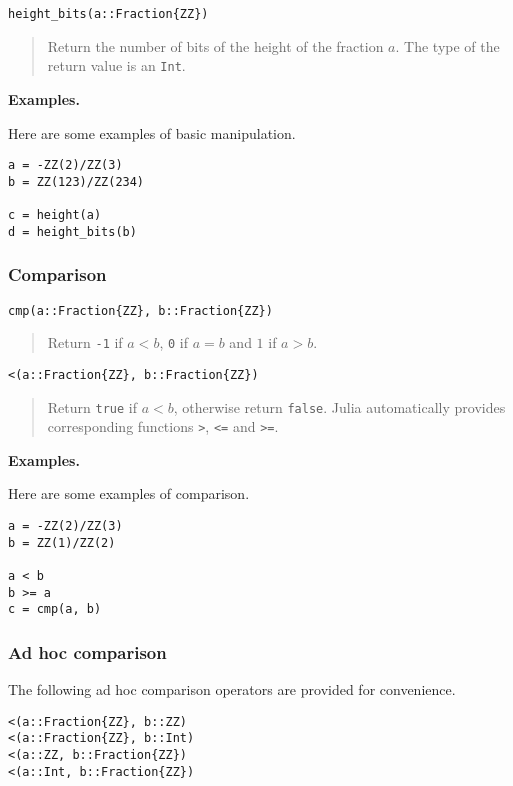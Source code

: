 \documentclass[a4paper,10pt]{article}
\newcommand{\code}{\lstinline}
\newcommand{\desc}[1]{\vspace{-3mm}\begin{quote}#1\end{quote}}
\begin{document}
{{{\begin{lstlisting}
height_bits(a::Fraction{ZZ})
\end{lstlisting}

\desc{Return the number of bits of the height of the fraction $a$. The type of
the return value is an \code{Int}.}

\textbf{Examples.}

Here are some examples of basic manipulation.

\begin{lstlisting}
a = -ZZ(2)/ZZ(3)
b = ZZ(123)/ZZ(234)

c = height(a)
d = height_bits(b)
\end{lstlisting}

\subsubsection{Comparison}

\begin{lstlisting}
cmp(a::Fraction{ZZ}, b::Fraction{ZZ}) 
\end{lstlisting}

\desc{Return \code{-1} if $a < b$, \code{0} if $a = b$ and $1$ if $a > b$.}

\begin{lstlisting}
<(a::Fraction{ZZ}, b::Fraction{ZZ}) 
\end{lstlisting}

\desc{Return \code{true} if $a < b$, otherwise return \code{false}. Julia
automatically provides corresponding functions \code{>}, \code{<=} and
\code{>=}.}

\textbf{Examples.}

Here are some examples of comparison.

\begin{lstlisting}
a = -ZZ(2)/ZZ(3)
b = ZZ(1)/ZZ(2)

a < b
b >= a
c = cmp(a, b)
\end{lstlisting}

\subsubsection{Ad hoc comparison}

The following ad hoc comparison operators are provided for convenience.

\begin{lstlisting}
<(a::Fraction{ZZ}, b::ZZ)
<(a::Fraction{ZZ}, b::Int)
<(a::ZZ, b::Fraction{ZZ})
<(a::Int, b::Fraction{ZZ})
\end{lstlisting}

}}}
\end{document}
